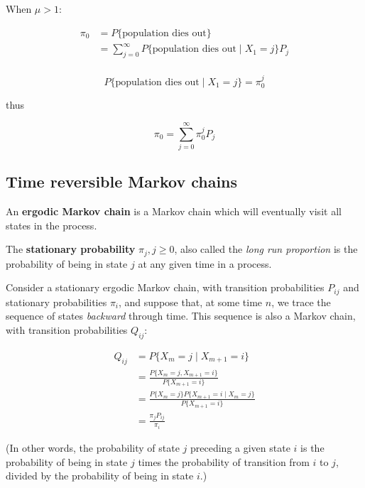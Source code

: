 \documentclass{article}
\newcommand\Prob[1]{P\{#1\}}
\begin{document}
When $\mu > 1$:

\begin{align*}
    \pi_0 & = P\{\text{population dies out}\} \\
          & = \sum_{j=0}^\infty
          P\{\text{population dies out} \mid X_1 = j\} P_j \\
\end{align*}

\[
    P\{\text{population dies out} \mid X_1 = j\}
    = \pi_0^j
\]

thus

\[
    \pi_0 = \sum_{j=0}^\infty \pi_0^j P_j
\]


\subsection{Time reversible Markov chains}

\begin{definition}
    An \textbf{ergodic Markov chain} is a Markov chain which will
    eventually visit all states in the process.
\end{definition}

\begin{definition}
    The \textbf{stationary probability} $\pi_j, j \ge 0$, also called
    the \emph{long run proportion} is the probability of being in state
    $j$ at any given time in a process.
\end{definition}

Consider a stationary ergodic Markov chain, with transition
probabilities $P_{ij}$ and stationary probabilities $\pi_i$, and suppose
that, at some time $n$, we trace the sequence of states \emph{backward}
through time.  This sequence is also a Markov chain, with transition
probabilities $Q_{ij}$:

\begin{align*}
    Q_{ij} &= \Prob{X_m = j \mid X_{m+1} = i} \\
           &= \frac{\Prob{X_m = j, X_{m+1} = i}}
           {\Prob{X_{m+1} = i}} \\
           &= \frac{\Prob{X_m = j} \Prob{X_{m+1} = i \mid X_m = j}}
           {\Prob{X_{m+1} = i}} \\
           &= \frac{\pi_j P_{ij}}{\pi_i}
\end{align*}

(In other words, the probability of state $j$ preceding a given state
$i$ is the probability of being in state $j$ times the probability of
transition from $i$ to $j$, divided by the probability of being in state
$i$.)
\end{document}
